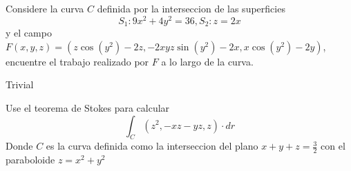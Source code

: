 \message{ !name(MAT024.tex)}\documentclass[../main.tex]{subfiles}
\begin{document}
\begin{problem}
  Considere la curva $C$ definida por la interseccion de las superficies
  \begin{equation*}
    S_{1}: 9x^{2} + 4y^{2} = 36, S_{2} : z = 2x
  \end{equation*}
  y el campo $F(x, y, z) = (z \cos(y^{2}) - 2z, -2xyz \sin(y^{2}) - 2x, x \cos(y^{2}) -2y)$, encuentre el trabajo realizado por $F$ a lo largo de la curva.
\end{problem}
\begin{solution}
Trivial
\end{solution}

\begin{problem}
  Use el teorema de Stokes para calcular
  \begin{equation*}
    \int_{C} (z^{2}, -xz - yz, z) \cdot dr
  \end{equation*}
  Donde $C$ es la curva definida como la interseccion del plano $x + y + z = \frac32$ con el paraboloide $z = x^{2} + y^{2}$
\end{problem}
\end{document}
